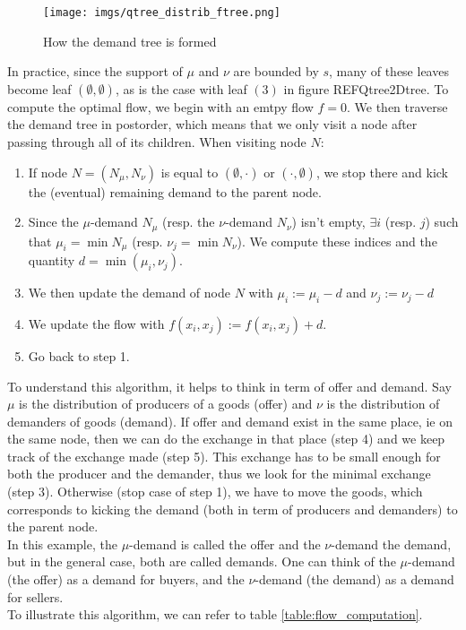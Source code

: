 \documentclass{article}
\begin{document}
\begin{figure}[h]
\centering
\texttt{[image: imgs/qtree\_distrib\_ftree.png]}
\caption{How the demand tree is formed}
\label{qtree_distrib_ftree}
\end{figure}

In practice, since the support of $\mu$ and $\nu$ are bounded by $s$, 
many of these leaves become leaf $(\emptyset, \emptyset)$, 
as is the case with leaf $(3)$ in figure REFQtree2Dtree. 
To compute the optimal flow, we begin with an emtpy flow $f=0$. We then traverse the demand tree in postorder, which means that we only visit a node after passing through all of its children. When visiting node $N$:

\begin{enumerate}

\item If node $N = (N_\mu, N_\nu)$ is equal to $(\emptyset, \cdot)$ or $(\cdot, \emptyset)$, we stop there and kick the (eventual) remaining demand to the parent node.

\item Since the $\mu$-demand $N_\mu$ (resp. the $\nu$-demand $N_\nu$) isn't empty, $\exists i$ (resp. $j$) such that $\mu_i = \min N_\mu$ (resp. $\nu_j = \min N_\nu$). We compute these indices and the quantity $d = \min (\mu_i, \nu_j)$.

\item We then update the demand of node $N$ with $\mu_i := \mu_i - d$ and $\nu_j := \nu_j - d$ 

\item We update the flow with $f(x_i, x_j) := f(x_i, x_j) + d$.

\item Go back to step 1.

\end{enumerate}

To understand this algorithm, it helps to think in term of offer and demand. Say $\mu$ is the distribution of producers of a goods (offer) and $\nu$ is the distribution of demanders of goods (demand). If offer and demand exist in the same place, ie on the same node, then we can do the exchange in that place (step 4) and we keep track of the exchange made (step 5). This exchange has to be small enough for both the producer and the demander, thus we look for the minimal exchange (step 3). Otherwise (stop case of step 1), we have to move the goods, which corresponds to kicking the demand (both in term of producers and demanders) to the parent node.\\
In this example, the $\mu$-demand is called the offer and the $\nu$-demand the demand, but in the general case, both are called demands. One can think of the $\mu$-demand (the offer) as a demand for buyers, and the $\nu$-demand (the demand) as a demand for sellers. \\
To illustrate this algorithm, we can refer to table \ref{table:flow_computation}.
\end{document}
